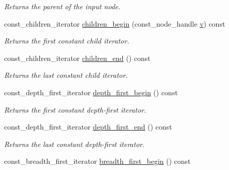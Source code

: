\begin{DoxyCompactItemize}
\begin{DoxyCompactList}\small\item\em Returns the parent of the input node. \end{DoxyCompactList}\item 
\hypertarget{class_d_o_1_1_tree_a2d8a88ca545846840e8c0715cc3f36fc}{const\-\_\-children\-\_\-iterator \hyperlink{class_d_o_1_1_tree_a2d8a88ca545846840e8c0715cc3f36fc}{children\-\_\-begin} (const\-\_\-node\-\_\-handle \hyperlink{group___channel_accessors_ga1dd2524c5b8d3db33137eedb803fc2ce}{v}) const }\label{class_d_o_1_1_tree_a2d8a88ca545846840e8c0715cc3f36fc}

\begin{DoxyCompactList}\small\item\em Returns the first constant child iterator. \end{DoxyCompactList}\item 
\hypertarget{class_d_o_1_1_tree_a4920faae174fd8fe38f2deef38ee7c6c}{const\-\_\-children\-\_\-iterator \hyperlink{class_d_o_1_1_tree_a4920faae174fd8fe38f2deef38ee7c6c}{children\-\_\-end} () const }\label{class_d_o_1_1_tree_a4920faae174fd8fe38f2deef38ee7c6c}

\begin{DoxyCompactList}\small\item\em Returns the last constant child iterator. \end{DoxyCompactList}\item 
\hypertarget{class_d_o_1_1_tree_a9eb8970c962399d0408e4e0a2734d75e}{const\-\_\-depth\-\_\-first\-\_\-iterator \hyperlink{class_d_o_1_1_tree_a9eb8970c962399d0408e4e0a2734d75e}{depth\-\_\-first\-\_\-begin} () const }\label{class_d_o_1_1_tree_a9eb8970c962399d0408e4e0a2734d75e}

\begin{DoxyCompactList}\small\item\em Returns the first constant depth-\/first iterator. \end{DoxyCompactList}\item 
\hypertarget{class_d_o_1_1_tree_a57f445cd71fd4dc556f451dcaac45ad2}{const\-\_\-depth\-\_\-first\-\_\-iterator \hyperlink{class_d_o_1_1_tree_a57f445cd71fd4dc556f451dcaac45ad2}{depth\-\_\-first\-\_\-end} () const }\label{class_d_o_1_1_tree_a57f445cd71fd4dc556f451dcaac45ad2}

\begin{DoxyCompactList}\small\item\em Returns the last constant depth-\/first iterator. \end{DoxyCompactList}\item 
\hypertarget{class_d_o_1_1_tree_ad097f916ecfaf0eebfb0183c610ddcae}{const\-\_\-breadth\-\_\-first\-\_\-iterator \hyperlink{class_d_o_1_1_tree_ad097f916ecfaf0eebfb0183c610ddcae}{breadth\-\_\-first\-\_\-begin} () const }\label{class_d_o_1_1_tree_ad097f916ecfaf0eebfb0183c610ddcae}


\end{DoxyCompactItemize}
